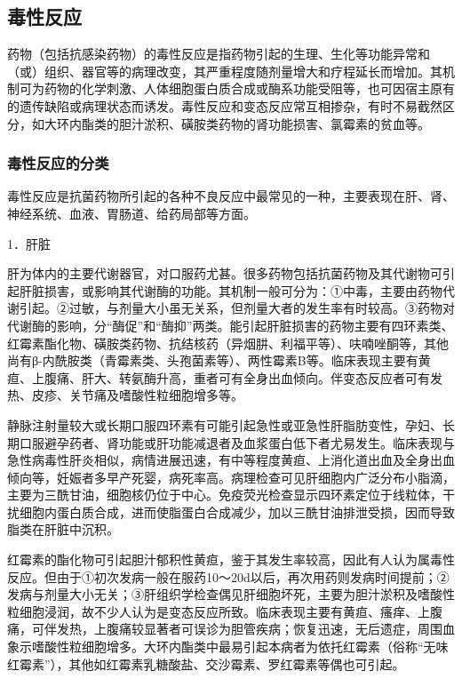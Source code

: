 \subsection{毒性反应}

药物（包括抗感染药物）的毒性反应是指药物引起的生理、生化等功能异常和（或）组织、器官等的病理改变，其严重程度随剂量增大和疗程延长而增加。其机制可为药物的化学刺激、人体细胞蛋白质合成或酶系功能受阻等，也可因宿主原有的遗传缺陷或病理状态而诱发。毒性反应和变态反应常互相掺杂，有时不易截然区分，如大环内酯类的胆汁淤积、磺胺类药物的肾功能损害、氯霉素的贫血等。

\subsubsection{毒性反应的分类}

毒性反应是抗菌药物所引起的各种不良反应中最常见的一种，主要表现在肝、肾、神经系统、血液、胃肠道、给药局部等方面。

1．肝脏

肝为体内的主要代谢器官，对口服药尤甚。很多药物包括抗菌药物及其代谢物可引起肝脏损害，或影响其代谢酶的功能。其机制一般可分为：①中毒，主要由药物代谢引起。②过敏，与剂量大小虽无关系，但剂量大者的发生率有时较高。③药物对代谢酶的影响，分“酶促”和“酶抑”两类。能引起肝脏损害的药物主要有四环素类、红霉素酯化物、磺胺类药物、抗结核药（异烟肼、利福平等）、呋喃唑酮等，其他尚有β-内酰胺类（青霉素类、头孢菌素等）、两性霉素B等。临床表现主要有黄疸、上腹痛、肝大、转氨酶升高，重者可有全身出血倾向。伴变态反应者可有发热、皮疹、关节痛及嗜酸性粒细胞增多等。

静脉注射量较大或长期口服四环素有可能引起急性或亚急性肝脂肪变性，孕妇、长期口服避孕药者、肾功能或肝功能减退者及血浆蛋白低下者尤易发生。临床表现与急性病毒性肝炎相似，病情进展迅速，有中等程度黄疸、上消化道出血及全身出血倾向等，妊娠者多早产死婴，病死率高。病理检查可见肝细胞内广泛分布小脂滴，主要为三酰甘油，细胞核仍位于中心。免疫荧光检查显示四环素定位于线粒体，干扰细胞内蛋白质合成，进而使脂蛋白合成减少，加以三酰甘油排泄受损，因而导致脂类在肝脏中沉积。

红霉素的酯化物可引起胆汁郁积性黄疸，鉴于其发生率较高，因此有人认为属毒性反应。但由于①初次发病一般在服药10～20d以后，再次用药则发病时间提前；②发病与剂量大小无关；③肝组织学检查偶见肝细胞坏死，主要为胆汁淤积及嗜酸性粒细胞浸润，故不少人认为是变态反应所致。临床表现主要有黄疸、瘙痒、上腹痛，可伴发热，上腹痛较显著者可误诊为胆管疾病；恢复迅速，无后遗症，周围血象示嗜酸性粒细胞增多。大环内酯类中最易引起本病者为依托红霉素（俗称“无味红霉素”），其他如红霉素乳糖酸盐、交沙霉素、罗红霉素等偶也可引起。

